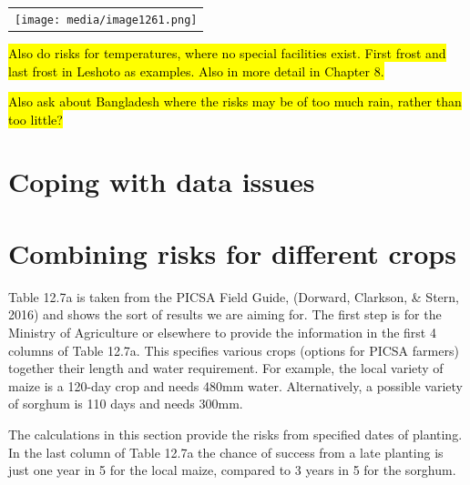 \documentclass[
  letterpaper,
  DIV=11,
  numbers=noendperiod]{scrreprt}
\begin{document}
\begin{longtable}[]{@{}
  >{\raggedright\arraybackslash}p{}@{}}
\toprule\noalign{}
\endhead
\bottomrule\noalign{}
\endlastfoot
\texttt{[image: media/image1261.png]} \\
\end{longtable}

\hl{Also do risks for temperatures, where no special facilities exist.
First frost and last frost in Leshoto as examples. Also in more detail
in Chapter 8.}

\hl{Also ask about Bangladesh where the risks may be of too much rain,
rather than too little?}

\section{Coping with data issues}\label{coping-with-data-issues}

\section{Combining risks for different
crops}\label{combining-risks-for-different-crops}

Table 12.7a is taken from the PICSA Field Guide, (Dorward, Clarkson, \&
Stern, 2016) and shows the sort of results we are aiming for. The first
step is for the Ministry of Agriculture or elsewhere to provide the
information in the first 4 columns of Table 12.7a. This specifies
various crops (options for PICSA farmers) together their length and
water requirement. For example, the local variety of maize is a 120-day
crop and needs 480mm water. Alternatively, a possible variety of sorghum
is 110 days and needs 300mm.

The calculations in this section provide the risks from specified dates
of planting. In the last column of Table 12.7a the chance of success
from a late planting is just one year in 5 for the local maize, compared
to 3 years in 5 for the sorghum.
\end{document}
